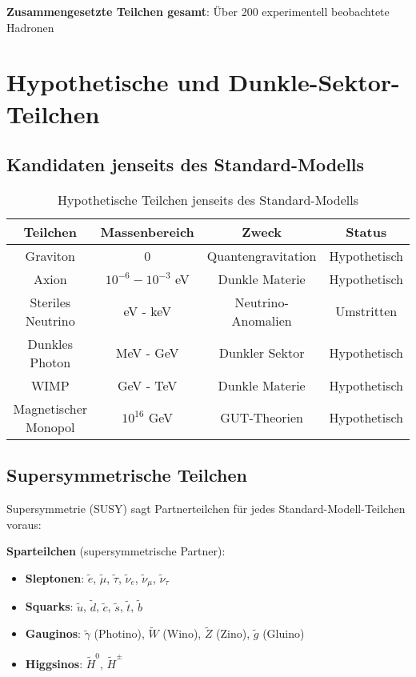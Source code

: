\documentclass[12pt,a4paper]{article}
\begin{document}
	\textbf{Zusammengesetzte Teilchen gesamt}: Über 200 experimentell beobachtete Hadronen
	
	\section{Hypothetische und Dunkle-Sektor-Teilchen}
	
	\subsection{Kandidaten jenseits des Standard-Modells}
	
	\begin{table}[htbp]
		\centering
		\begin{tabular}{|c|c|c|c|}
			\hline
			\textbf{Teilchen} & \textbf{Massenbereich} & \textbf{Zweck} & \textbf{Status} \\
			\hline
			\hline
			Graviton & 0 & Quantengravitation & Hypothetisch \\
			Axion & $10^{-6} - 10^{-3}$ eV & Dunkle Materie & Hypothetisch \\
			Steriles Neutrino & eV - keV & Neutrino-Anomalien & Umstritten \\
			Dunkles Photon & MeV - GeV & Dunkler Sektor & Hypothetisch \\
			WIMP & GeV - TeV & Dunkle Materie & Hypothetisch \\
			Magnetischer Monopol & $10^{16}$ GeV & GUT-Theorien & Hypothetisch \\
			\hline
		\end{tabular}
		\caption{Hypothetische Teilchen jenseits des Standard-Modells}
		\label{tab:hypothetical_particles}
	\end{table}
	
	\subsection{Supersymmetrische Teilchen}
	
	Supersymmetrie (SUSY) sagt Partnerteilchen für jedes Standard-Modell-Teilchen voraus:
	
	\textbf{Sparteilchen} (supersymmetrische Partner):
	\begin{itemize}
		\item \textbf{Sleptonen}: $\tilde{e}$, $\tilde{\mu}$, $\tilde{\tau}$, $\tilde{\nu}_e$, $\tilde{\nu}_\mu$, $\tilde{\nu}_\tau$
		\item \textbf{Squarks}: $\tilde{u}$, $\tilde{d}$, $\tilde{c}$, $\tilde{s}$, $\tilde{t}$, $\tilde{b}$
		\item \textbf{Gauginos}: $\tilde{\gamma}$ (Photino), $\tilde{W}$ (Wino), $\tilde{Z}$ (Zino), $\tilde{g}$ (Gluino)
		\item \textbf{Higgsinos}: $\tilde{H}^0$, $\tilde{H}^{\pm}$
	\end{itemize}
	
\end{document}
